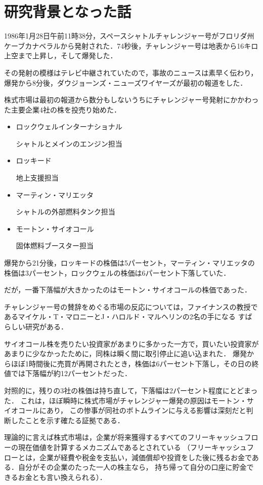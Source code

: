 \section{研究背景となった話}


1986年1月28日午前11時38分，スペースシャトルチャレンジャー号がフロリダ州ケーブカナベラルから発射された．74秒後，チャレンジャー号は地表から16キロ上空まで上昇し，そして爆発した．

その発射の模様はテレビ中継されていたので，事故のニュースは素早く伝わり，爆発から8分後，ダウジョーンズ・ニューズワイヤーズが最初の報道をした．

株式市場は最初の報道から数分もしないうちにチャレンジャー号発射にかかわった主要企業4社の株を投売り始めた．

\begin{itemize}
  \item ロックウェルインターナショナル

シャトルとメインのエンジン担当
  \item ロッキード

地上支援担当
  \item マーティン・マリエッタ

シャトルの外部燃料タンク担当
  \item モートン・サイオコール  

固体燃料ブースター担当
\end{itemize}


爆発から21分後，ロッキードの株価は5パーセント，マーティン・マリエッタの株価は3パーセント，ロックウェルの株価は6パーセント下落していた．

だが，一番下落幅が大きかったのはモートン・サイオコールの株価であった．

チャレンジャー号の賛辞をめぐる市場の反応については，ファイナンスの教授であるマイケル・T・マロニーとJ・ハロルド・マルヘリンの2名の手になる
すばらしい研究がある．

サイオコール株を売りたい投資家があまりに多かった一方で，買いたい投資家があまりに少なかったために，同株は瞬く間に取引停止に追い込まれた．
爆発からほぼ1時間後に売買が再開されたとき，株価は6パーセント下落し，その日の終値では下落幅が約12パーセントだった．

対照的に，残りの3社の株価は持ち直して，下落幅は2パーセント程度にとどまった．
これは，ほぼ瞬時に株式市場がチャレンジャー爆発の原因はモートン・サイオコールにあり，
この惨事が同社のボトムラインに与える影響は深刻だと判断したことを示す確たる証拠である．

理論的に言えば株式市場は，企業が将来獲得するすべてのフリーキャッシュフローの現在価値を計算するメカニズムであるとされている
（フリーキャッシュフローとは，企業が経費や税金を支払い，減価償却や投資をした後に残るお金である．自分がその企業のたった一人の株主なら，
持ち帰って自分の口座に貯金できるお金とも言い換えられる）．

